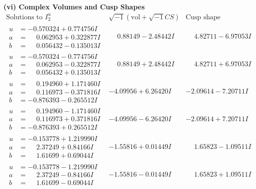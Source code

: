 \documentclass[1p]{elsarticle_modified}
\theoremstyle{definition}
\newcommand{\I}{\sqrt{-1}}
\begin{document}
\newpage\flushleft \textbf{(vi) Complex Volumes and Cusp Shapes}
$$\begin{array}{c|c|c}  
\text{Solutions to }I^u_{2}& \I (\text{vol} + \sqrt{-1}CS) & \text{Cusp shape}\\
 \hline 
\begin{aligned}
u &= -0.570324 + 0.774756 I \\
a &= \phantom{-}0.062953 + 0.322877 I \\
b &= \phantom{-}0.056432 - 0.135013 I\end{aligned}
 & \phantom{-}0.88149 - 2.48442 I & \phantom{-}4.82711 - 6.97053 I \\ \hline\begin{aligned}
u &= -0.570324 - 0.774756 I \\
a &= \phantom{-}0.062953 - 0.322877 I \\
b &= \phantom{-}0.056432 + 0.135013 I\end{aligned}
 & \phantom{-}0.88149 + 2.48442 I & \phantom{-}4.82711 + 6.97053 I \\ \hline\begin{aligned}
u &= \phantom{-}0.194960 + 1.171460 I \\
a &= \phantom{-}0.116973 - 0.371816 I \\
b &= -0.876393 - 0.265512 I\end{aligned}
 & -4.09956 + 6.26420 I & -2.09614 - 7.20711 I \\ \hline\begin{aligned}
u &= \phantom{-}0.194960 - 1.171460 I \\
a &= \phantom{-}0.116973 + 0.371816 I \\
b &= -0.876393 + 0.265512 I\end{aligned}
 & -4.09956 - 6.26420 I & -2.09614 + 7.20711 I \\ \hline\begin{aligned}
u &= -0.153778 + 1.219990 I \\
a &= \phantom{-}2.37249 + 0.84166 I \\
b &= \phantom{-}1.61699 + 0.69044 I\end{aligned}
 & -1.55816 + 0.01449 I & \phantom{-}1.65823 - 1.09511 I \\ \hline\begin{aligned}
u &= -0.153778 - 1.219990 I \\
a &= \phantom{-}2.37249 - 0.84166 I \\
b &= \phantom{-}1.61699 - 0.69044 I\end{aligned}
 & -1.55816 - 0.01449 I & \phantom{-}1.65823 + 1.09511 I \\ \hline\begin{aligned}

\end{aligned}
\end{array}$$
\end{document}
